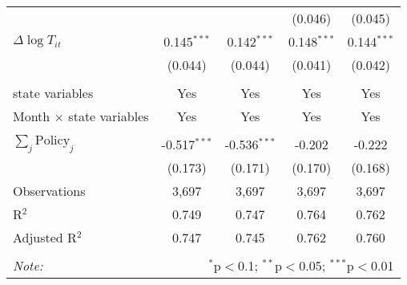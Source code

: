 \begin{tabular}{@{\extracolsep{1pt}}lcccc}
  &  &  & (0.046) & (0.045) \\ 
  $\Delta \log T_{it}$ & 0.145$^{***}$ & 0.142$^{***}$ & 0.148$^{***}$ & 0.144$^{***}$ \\ 
  & (0.044) & (0.044) & (0.041) & (0.042) \\ 
 \hline \\[-1.8ex] 
state variables & Yes & Yes & Yes & Yes \\ 
Month $\times$ state variables & Yes & Yes & Yes & Yes \\ 
\hline \\[-1.8ex] 
$\sum_j \mathrm{Policy}_j$ & -0.517$^{***}$ & -0.536$^{***}$ & -0.202 & -0.222 \\ 
 & (0.173) & (0.171) & (0.170) & (0.168) \\ 
Observations & 3,697 & 3,697 & 3,697 & 3,697 \\ 
R$^{2}$ & 0.749 & 0.747 & 0.764 & 0.762 \\ 
Adjusted R$^{2}$ & 0.747 & 0.745 & 0.762 & 0.760 \\ 
\hline 
\hline \\[-1.8ex] 
\textit{Note:}  & \multicolumn{4}{r}{$^{*}$p$<$0.1; $^{**}$p$<$0.05; $^{***}$p$<$0.01} \\ 
\end{tabular} 